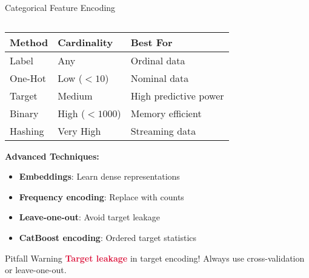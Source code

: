 \documentclass[aspectratio=169,11pt]{beamer}
\begin{document}
\begin{frame}[fragile]{Categorical Feature Encoding}
\begin{columns}
\begin{column}{0.45\textwidth}
\begin{table}
\centering
\tiny
\begin{tabular}{p{2cm}p{1.5cm}p{1.5cm}}
\toprule
\textbf{Method} & \textbf{Cardinality} & \textbf{Best For} \\
\midrule
Label & Any & Ordinal data \\
One-Hot & Low ($<10$) & Nominal data \\
Target & Medium & High predictive power \\
Binary & High ($<1000$) & Memory efficient \\
Hashing & Very High & Streaming data \\
\bottomrule
\end{tabular}
\end{table}

\vspace{0.3cm}
\textbf{Advanced Techniques:}
\begin{itemize}
\item \textbf{Embeddings}: Learn dense representations
\item \textbf{Frequency encoding}: Replace with counts
\item \textbf{Leave-one-out}: Avoid target leakage
\item \textbf{CatBoost encoding}: Ordered target statistics
\end{itemize}

\begin{alertblock}{Pitfall Warning}
\textcolor{crimson}{\textbf{Target leakage}} in target encoding! Always use cross-validation or leave-one-out.
\end{alertblock}
\end{column}
\end{columns}
\end{frame}
\end{document}
